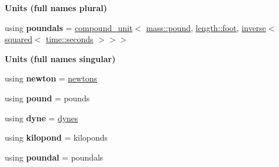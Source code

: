 \begin{Indent}{\bf Units (full names plural)}
\begin{DoxyCompactItemize}
\item 
\hypertarget{namespaceunits_1_1force_a69668e9deca0419ec697819a6077409c}{}using {\bfseries poundals} = \hyperlink{group___unit_types_ga9c3f6f077dc894620e1ed8358442a8f1}{compound\+\_\+unit}$<$ \hyperlink{structunits_1_1unit}{mass\+::pound}, \hyperlink{structunits_1_1unit}{length\+::foot}, \hyperlink{group___unit_manipulators_gaacc539ef162e24b260d023d3ff949b57}{inverse}$<$ \hyperlink{group___unit_manipulators_ga636346f7898c35eb98a796bec1d77fb2}{squared}$<$ \hyperlink{structunits_1_1unit}{time\+::seconds} $>$$>$$>$\label{namespaceunits_1_1force_a69668e9deca0419ec697819a6077409c}

\end{DoxyCompactItemize}
\end{Indent}
\begin{Indent}{\bf Units (full names singular)}\par
\begin{DoxyCompactItemize}
\item 
\hypertarget{namespaceunits_1_1force_abb065eb1201939ed85c6178710d6e1dc}{}using {\bfseries newton} = \hyperlink{structunits_1_1unit}{newtons}\label{namespaceunits_1_1force_abb065eb1201939ed85c6178710d6e1dc}

\item 
\hypertarget{namespaceunits_1_1force_a9b2209ece08dc7c98ba50ac6d6a07462}{}using {\bfseries pound} = pounds\label{namespaceunits_1_1force_a9b2209ece08dc7c98ba50ac6d6a07462}

\item 
\hypertarget{namespaceunits_1_1force_a5bf84ba9d15ae91ace4265e9b0d016f9}{}using {\bfseries dyne} = \hyperlink{structunits_1_1unit}{dynes}\label{namespaceunits_1_1force_a5bf84ba9d15ae91ace4265e9b0d016f9}

\item 
\hypertarget{namespaceunits_1_1force_acb72283ad6db04db682b1b8c1ca747c1}{}using {\bfseries kilopond} = kiloponds\label{namespaceunits_1_1force_acb72283ad6db04db682b1b8c1ca747c1}

\item 
\hypertarget{namespaceunits_1_1force_a4eea9461edfc3557dc6ca829a6ec07a8}{}using {\bfseries poundal} = poundals\label{namespaceunits_1_1force_a4eea9461edfc3557dc6ca829a6ec07a8}

\end{DoxyCompactItemize}
\end{Indent}
